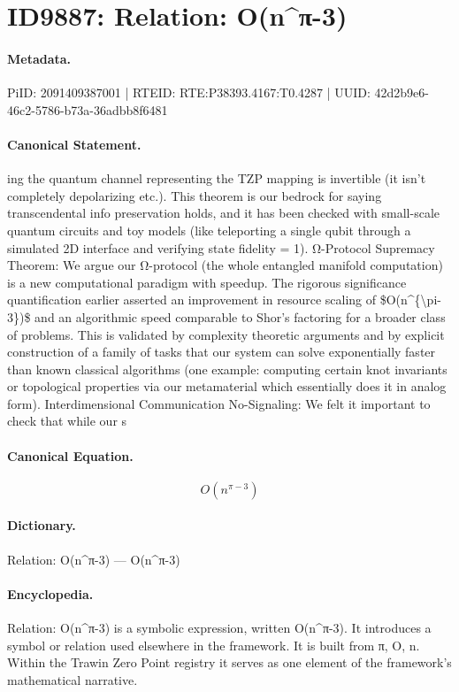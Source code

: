 \section*{ID9887: Relation: O(n\textasciicircum{}π-3)}
\paragraph{Metadata.}
PiID: 2091409387001 | RTEID: RTE:P38393.4167:T0.4287 | UUID: 42d2b9e6-46c2-5786-b73a-36adbb8f6481

\paragraph{Canonical Statement.}
ing the quantum channel representing the TZP mapping is invertible (it isn’t completely depolarizing etc.). This theorem is our bedrock for saying transcendental info preservation holds, and it has been checked with small-scale quantum circuits and toy models (like teleporting a single qubit through a simulated 2D interface and verifying state fidelity = 1). Ω-Protocol Supremacy Theorem: We argue our Ω-protocol (the whole entangled manifold computation) is a new computational paradigm with speedup. The rigorous significance quantification earlier asserted an improvement in resource scaling of \$O(n\textasciicircum{}\{\textbackslash{}pi-3\})\$ and an algorithmic speed comparable to Shor’s factoring for a broader class of problems. This is validated by complexity theoretic arguments and by explicit construction of a family of tasks that our system can solve exponentially faster than known classical algorithms (one example: computing certain knot invariants or topological properties via our metamaterial which essentially does it in analog form). Interdimensional Communication No-Signaling: We felt it important to check that while our s

\paragraph{Canonical Equation.}
\[
O(n^{\pi-3})
\]

\paragraph{Dictionary.}
Relation: O(n\textasciicircum{}π-3) — O(n\textasciicircum{}π-3)

\paragraph{Encyclopedia.}
Relation: O(n\textasciicircum{}π-3) is a symbolic expression, written O(n\textasciicircum{}π-3). It introduces a symbol or relation used elsewhere in the framework. It is built from π, O, n. Within the Trawin Zero Point registry it serves as one element of the framework's mathematical narrative.
